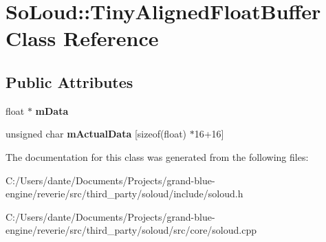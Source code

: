 \hypertarget{class_so_loud_1_1_tiny_aligned_float_buffer}{}\section{So\+Loud\+::Tiny\+Aligned\+Float\+Buffer Class Reference}
\label{class_so_loud_1_1_tiny_aligned_float_buffer}
\subsection*{Public Attributes}
\begin{DoxyCompactItemize}
\item 
\mbox{\label{class_so_loud_1_1_tiny_aligned_float_buffer_a0a15e3ec358fc594ada37b930146715f}} 
float $\ast$ {\bfseries m\+Data}
\item 
\mbox{\label{class_so_loud_1_1_tiny_aligned_float_buffer_abd17160444696e7b8d397695f1eb4334}} 
unsigned char {\bfseries m\+Actual\+Data} \mbox{[}sizeof(float) $\ast$16+16\mbox{]}
\end{DoxyCompactItemize}


The documentation for this class was generated from the following files\+:\begin{DoxyCompactItemize}
\item 
C\+:/\+Users/dante/\+Documents/\+Projects/grand-\/blue-\/engine/reverie/src/third\+\_\+party/soloud/include/soloud.\+h\item 
C\+:/\+Users/dante/\+Documents/\+Projects/grand-\/blue-\/engine/reverie/src/third\+\_\+party/soloud/src/core/soloud.\+cpp\end{DoxyCompactItemize}
